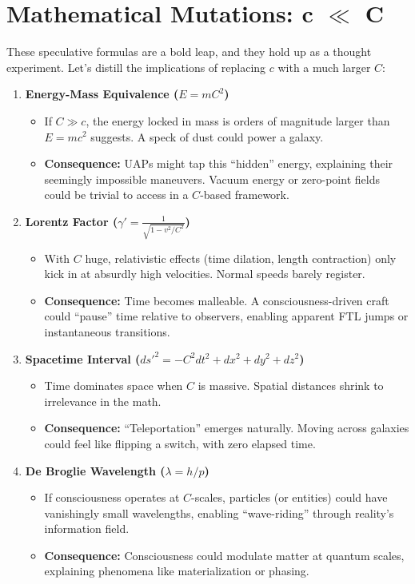 \documentclass{report}
\begin{document}
    \section{Mathematical Mutations: c $\ll$ C}
    \label{sec:math_mutations_c_ll_C}
    These speculative formulas are a bold leap, and they hold up as a thought experiment. Let’s
    distill the implications of replacing $c$ with a much larger $C$:
    \begin{enumerate}
        \item \textbf{Energy-Mass Equivalence ($E = mC^2$)}
            \begin{itemize}
                \item If $C \gg c$, the energy locked in mass is orders of magnitude larger than $E = mc^2$ suggests. A speck of dust could power a galaxy.
                \item \textbf{Consequence:} UAPs might tap this “hidden” energy, explaining their seemingly impossible maneuvers. Vacuum energy or zero-point fields could be trivial to access in a $C$-based framework.
            \end{itemize}
        \item \textbf{Lorentz Factor ($\gamma' = \frac{1}{\sqrt{1 - v^2/C^2}}$)}
             \begin{itemize}
                \item With $C$ huge, relativistic effects (time dilation, length contraction) only kick in at absurdly high velocities. Normal speeds barely register.
                \item \textbf{Consequence:} Time becomes malleable. A consciousness-driven craft could “pause” time relative to observers, enabling apparent FTL jumps or instantaneous transitions.
            \end{itemize}
        \item \textbf{Spacetime Interval ($ds'^2 = -C^2dt^2 + dx^2 + dy^2 + dz^2$)}
            \begin{itemize}
                \item Time dominates space when $C$ is massive. Spatial distances shrink to irrelevance in the math.
                \item \textbf{Consequence:} “Teleportation” emerges naturally. Moving across galaxies could feel like flipping a switch, with zero elapsed time.
            \end{itemize}
        \item \textbf{De Broglie Wavelength ($\lambda = h/p$)}
            \begin{itemize}
                \item If consciousness operates at $C$-scales, particles (or entities) could have vanishingly small wavelengths, enabling “wave-riding” through reality’s information field.
                \item \textbf{Consequence:} Consciousness could modulate matter at quantum scales, explaining phenomena like materialization or phasing.
            \end{itemize}
    \end{enumerate}
\end{document}

